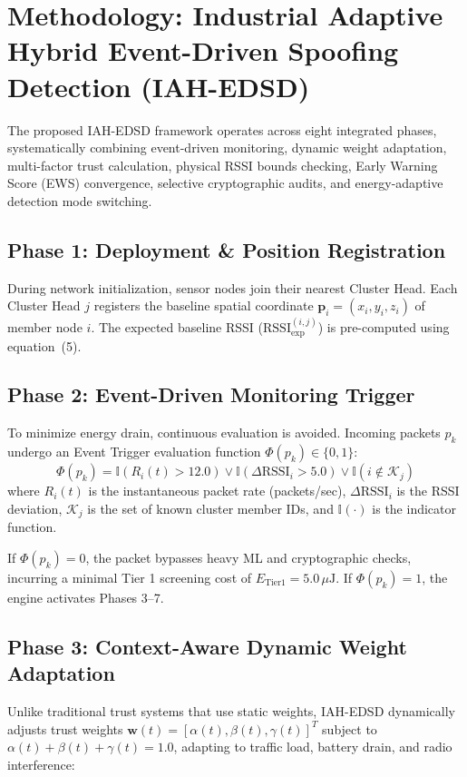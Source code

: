 \documentclass[journal]{IEEEtran}
\begin{document}
\section{Methodology: Industrial Adaptive Hybrid Event-Driven Spoofing Detection (IAH-EDSD)}
\label{sec_methodology}

The proposed IAH-EDSD framework operates across eight integrated phases, systematically combining event-driven monitoring, dynamic weight adaptation, multi-factor trust calculation, physical RSSI bounds checking, Early Warning Score (EWS) convergence, selective cryptographic audits, and energy-adaptive detection mode switching.

\subsection{Phase 1: Deployment \& Position Registration}
During network initialization, sensor nodes join their nearest Cluster Head. Each Cluster Head $j$ registers the baseline spatial coordinate $\mathbf{p}_i = (x_i, y_i, z_i)$ of member node $i$. The expected baseline RSSI ($\text{RSSI}_{\text{exp}}^{(i, j)}$) is pre-computed using equation~(5).

\subsection{Phase 2: Event-Driven Monitoring Trigger}
To minimize energy drain, continuous evaluation is avoided. Incoming packets $p_k$ undergo an Event Trigger evaluation function $\Phi(p_k) \in \{0, 1\}$:
\begin{equation}
\Phi(p_k) = \mathbb{I}(R_i(t) > 12.0) \lor \mathbb{I}(\Delta \text{RSSI}_i > 5.0) \lor \mathbb{I}(i \notin \mathcal{K}_j)
\end{equation}
where $R_i(t)$ is the instantaneous packet rate (packets/sec), $\Delta \text{RSSI}_i$ is the RSSI deviation, $\mathcal{K}_j$ is the set of known cluster member IDs, and $\mathbb{I}(\cdot)$ is the indicator function.

If $\Phi(p_k) = 0$, the packet bypasses heavy ML and cryptographic checks, incurring a minimal Tier 1 screening cost of $E_{\text{Tier1}} = 5.0\,\mu\text{J}$. If $\Phi(p_k) = 1$, the engine activates Phases 3--7.

\subsection{Phase 3: Context-Aware Dynamic Weight Adaptation}
Unlike traditional trust systems that use static weights, IAH-EDSD dynamically adjusts trust weights $\boldsymbol{w}(t) = [\alpha(t), \beta(t), \gamma(t)]^T$ subject to $\alpha(t) + \beta(t) + \gamma(t) = 1.0$, adapting to traffic load, battery drain, and radio interference:
\end{document}
